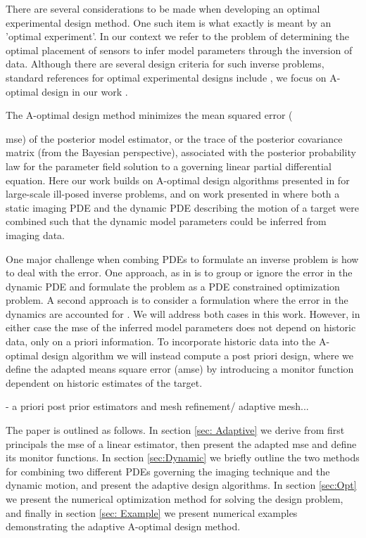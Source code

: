 \documentclass[11pt]{article}
\begin{document}
There are several considerations to be made when developing an optimal experimental design method. One such item is what exactly is meant by an 'optimal experiment'. In our context we refer to the problem of determining  the optimal placement of sensors to infer model parameters  through the inversion of  data. 
 Although there are several design criteria for such inverse problems, standard references for optimal experimental designs include \cite{Standard refs}, we focus on A-optimal design in our work \cite{Bunch of design refs}. 
 
 The A-optimal design method minimizes the mean squared error ({mse) of the posterior model estimator, or the trace of the posterior covariance matrix (from the Bayesian perspective), associated with the posterior probability law for the parameter field solution to a governing linear partial differential equation. Here our work builds on A-optimal design algorithms presented in \cite{habera} for large-scale ill-posed inverse problems, and on work presented in \cite{fohring2014} where both a static imaging PDE and the dynamic PDE describing the motion of a target were combined such that the dynamic model parameters could be inferred from imaging data. 

One major challenge when combing PDEs to formulate an inverse problem is how to deal with the error. One approach, as in \cite{fohring2014} is to group or ignore the error in the dynamic PDE and formulate the problem as a PDE constrained optimization problem. A second approach is to consider a formulation where the error in the dynamics are accounted for  \cite{kalman, sasha's thesis or something}. We will address both cases in this work. However, in either case the mse of the inferred model parameters does not depend on historic data, only on a priori information. To incorporate historic data into the A-optimal design algorithm we will instead compute a post priori design, where we define the adapted means square error  (amse) by introducing a monitor function dependent on historic estimates of the  target. 

- a priori post prior estimators and mesh refinement/ adaptive mesh...


\bigskip
The paper is outlined as follows. In section \ref{sec: Adaptive} we derive from first principals the mse of a linear estimator, then present the adapted mse and define its monitor functions. In section \ref{sec:Dynamic} we briefly outline the two methods for combining two different PDEs governing the imaging technique and the dynamic motion, and present the adaptive design algorithms.  
In section \ref{sec:Opt} we present the numerical optimization method for solving the design problem, and finally in section \ref{sec: Example}  we present  numerical examples demonstrating the adaptive A-optimal design method. 




}
\end{document}

